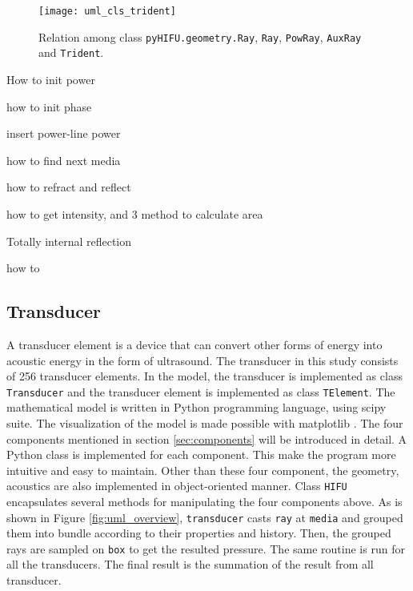 \begin{figure}[h]
    \centering
    \texttt{[image: uml\_cls\_trident]}
    \caption{Relation among class \texttt{pyHIFU.geometry.Ray}, \texttt{Ray}, \texttt{PowRay}, \texttt{AuxRay}  and  \texttt{Trident}.}
    \label{fig:uml_cls_trident}
\end{figure}
    
    
How to init power

how to init phase

insert power-line power

how to find next media

how to refract and reflect

how to get intensity, and 3 method to calculate area

Totally internal reflection

how to 
\subsection{Transducer}
A transducer element is a device that can convert other forms of energy into acoustic energy in the form of ultrasound. The transducer in this study consists of 256 transducer elements. In the model, the transducer is implemented as class \texttt{Transducer} and the transducer element is implemented as class \texttt{TElement}.
The mathematical model is written in Python programming language, using scipy suite\cite{scipy}. The visualization of the model is made possible with matplotlib \cite{matplotlib}. The four components mentioned in section \ref{sec:components} will be introduced in detail. A Python class is implemented for each component. This make the program more intuitive and easy to maintain. Other than these four component, the geometry, acoustics are also implemented in object-oriented manner. Class \texttt{HIFU} encapsulates several methods for manipulating the four components above. As is shown in Figure \ref{fig:uml_overview}, \texttt{transducer} casts \texttt{ray} at \texttt{media} and grouped them into bundle according to their properties and history. Then, the grouped rays are sampled on \texttt{box} to get the resulted pressure. The same routine is run for all the transducers. The final result is the summation of the result from all transducer.

